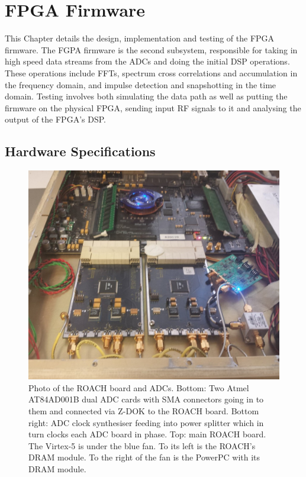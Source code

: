 \chapter{FPGA Firmware}
\label{ch:firmware-design}
\graphicspath{{./img/firmware/}}

This Chapter details the design, implementation and testing of the FPGA firmware. The FGPA firmware is the second subsystem, responsible for taking in high speed data streams from the ADCs and doing the initial DSP operations. These operations include FFTs, spectrum cross correlations and accumulation in the frequency domain, and impulse detection and snapshotting in the time domain. Testing involves both simulating the data path as well as putting the firmware on the physical FPGA, sending input RF signals to it and analysing the output of the FPGA's DSP.

\section{Hardware Specifications}

\begin{figure}
  \centering
  \includegraphics[width=\textwidth]{roach-photo}
  \caption{Photo of the ROACH board and ADCs. Bottom: Two Atmel AT84AD001B dual ADC cards with SMA connectors going in to them and connected via Z-DOK to the ROACH board. Bottom right: ADC clock synthesiser feeding into power splitter which in turn clocks each ADC board in phase. Top: main ROACH board. The Virtex-5 is under the blue fan. To its left is the ROACH's DRAM module. To the right of the fan is the PowerPC with its DRAM module.}
  \label{fig:firmware:roach-photo}
\end{figure}

